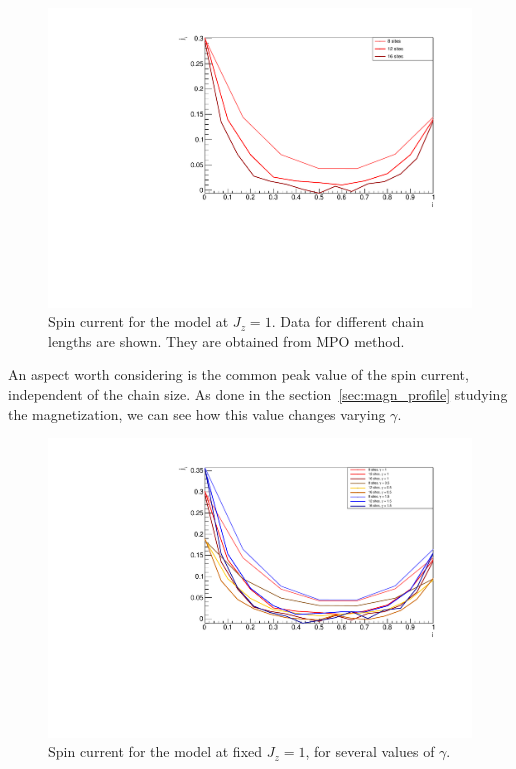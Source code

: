 \begin{figure}[H]
    \centering
    \includegraphics[scale=0.7]{Figures/NORM_SpinCurr_comparisonVSsize.pdf}
    \captionsetup{width=1.\linewidth}
    \caption{Spin current for the model at $J_z = 1$. Data for different chain lengths are shown. They are obtained from MPO method.}
    \label{fig:NORM_SpinCurr_comparisonVSsize}
\end{figure}

An aspect worth considering is the common peak value of the spin current, independent of the chain size. As done in the section~\ref{sec:magn_profile} studying the magnetization, we can see how this value changes varying $\gamma$. 

\begin{figure}[H]
    \centering
    \includegraphics[scale=0.7]{Figures/SpinCurrcomparisonVSsizeANDdissipationRate.pdf}
    \caption{Spin current for the model at fixed $J_z = 1$, for several values of $\gamma$.}
    \label{fig:SpinCurrcomparisonVSsizeANDdissipationRate}
\end{figure}


